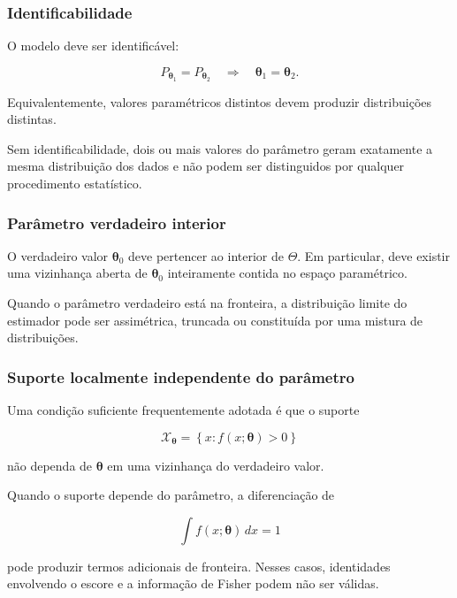 \documentclass[
  letterpaper,
  DIV=11,
  numbers=noendperiod]{scrreprt}
\begin{document}
\subsubsection{Identificabilidade}\label{identificabilidade}

O modelo deve ser identificável:

\[P_{\boldsymbol\theta_1}
=
P_{\boldsymbol\theta_2}
\quad\Longrightarrow\quad
\boldsymbol\theta_1
=
\boldsymbol\theta_2.\]

Equivalentemente, valores paramétricos distintos devem produzir
distribuições distintas.

Sem identificabilidade, dois ou mais valores do parâmetro geram
exatamente a mesma distribuição dos dados e não podem ser distinguidos
por qualquer procedimento estatístico.

\subsubsection{Parâmetro verdadeiro
interior}\label{paruxe2metro-verdadeiro-interior}

O verdadeiro valor \(\boldsymbol\theta_0\) deve pertencer ao interior de
\(\Theta\). Em particular, deve existir uma vizinhança aberta de
\(\boldsymbol\theta_0\) inteiramente contida no espaço paramétrico.

Quando o parâmetro verdadeiro está na fronteira, a distribuição limite
do estimador pode ser assimétrica, truncada ou constituída por uma
mistura de distribuições.

\subsubsection{Suporte localmente independente do
parâmetro}\label{suporte-localmente-independente-do-paruxe2metro}

Uma condição suficiente frequentemente adotada é que o suporte

\[\mathcal{X}_{\boldsymbol\theta}
=
\left\{
x:f(x;\boldsymbol\theta)>0
\right\}\]

não dependa de \(\boldsymbol\theta\) em uma vizinhança do verdadeiro
valor.

Quando o suporte depende do parâmetro, a diferenciação de

\[\int f(x;\boldsymbol\theta)\,dx=1\]

pode produzir termos adicionais de fronteira. Nesses casos, identidades
envolvendo o escore e a informação de Fisher podem não ser válidas.
\end{document}
